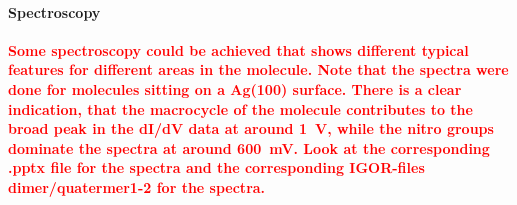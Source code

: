 
\paragraph{Spectroscopy}
\textcolor{red}{\textbf{
Some spectroscopy could be achieved that shows different typical features for different areas in the molecule. Note that the spectra were done for molecules sitting on a Ag(100) surface.
There is a clear indication, that the macrocycle of the molecule contributes to the broad peak in the dI/dV data at around \SI{1}{\V}, while the nitro groups dominate the spectra at around \SI{600}{\milli \V}. 
Look at the corresponding .pptx file for the spectra and the corresponding IGOR-files dimer/quatermer1-2 for the spectra.
}}